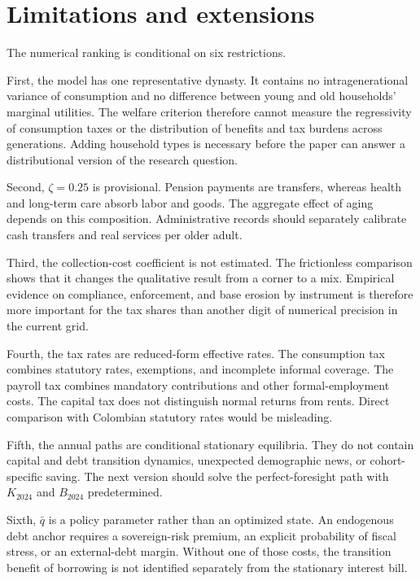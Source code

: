 \documentclass[12pt]{article}
\begin{document}
\section{Limitations and extensions}

The numerical ranking is conditional on six restrictions.

First, the model has one representative dynasty. It contains no
intragenerational variance of consumption and no difference between young and
old households' marginal utilities. The welfare criterion therefore cannot
measure the regressivity of consumption taxes or the distribution of benefits
and tax burdens across generations. Adding household types is necessary
before the paper can answer a distributional version of the research
question.

Second, $\zeta=0.25$ is provisional. Pension payments are transfers, whereas
health and long-term care absorb labor and goods. The aggregate effect of
aging depends on this composition. Administrative records should separately
calibrate cash transfers and real services per older adult.

Third, the collection-cost coefficient is not estimated. The frictionless
comparison shows that it changes the qualitative result from a corner to a
mix. Empirical evidence on compliance, enforcement, and base erosion by
instrument is therefore more important for the tax shares than another digit
of numerical precision in the current grid.

Fourth, the tax rates are reduced-form effective rates. The consumption tax
combines statutory rates, exemptions, and incomplete informal coverage. The
payroll tax combines mandatory contributions and other formal-employment
costs. The capital tax does not distinguish normal returns from rents. Direct
comparison with Colombian statutory rates would be misleading.

Fifth, the annual paths are conditional stationary equilibria. They do not
contain capital and debt transition dynamics, unexpected demographic news, or
cohort-specific saving. The next version should solve the perfect-foresight
path with $K_{2024}$ and $B_{2024}$ predetermined.

Sixth, $\bar q$ is a policy parameter rather than an optimized state. An
endogenous debt anchor requires a sovereign-risk premium, an explicit
probability of fiscal stress, or an external-debt margin. Without one of those
costs, the transition benefit of borrowing is not identified separately from
the stationary interest bill.
\end{document}
